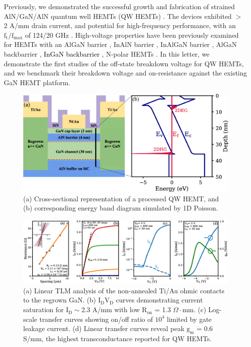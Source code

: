 \documentclass[journal]{IEEEtran}
\begin{document}
Previously, we demonstrated the successful growth and fabrication of strained AlN/GaN/AlN quantum well HEMTs (QW HEMTs) \cite{Wang2012,Islam2016,Song2017}. The devices exhibited $>$ 2 A/mm drain current, and potential for high-frequency performance, with an $\mathrm{f_t}/\mathrm{f_{max}}$ of 124/20 GHz \cite{Song2017}. High-voltage properties have been previously examined for HEMTs with an AlGaN barrier \cite{Chung2010,Palacios2006}, InAlN barrier \cite{Saunier2012,Snider2012}, InAlGaN barrier \cite{Guo2013,Lee2013}, AlGaN backbarrier \cite{Shinohara2010,Shinohara2011,Shinohara2011a,Tang2015}, \textcolor{black}{InGaN backbarrier \cite{YugangZhou2005,Palacios2006}}, N-polar HEMTs \cite{Dasgupta2009,Nidhi2012,Denninghoff2012,Denninghoff2012a,Denninghoff2013,Romanczyk2018}. In this letter, we demonstrate the first studies of the off-state breakdown voltage for QW HEMTs, and we benchmark their breakdown voltage and on-resistance against the existing GaN HEMT platform.
\begin{figure}[!b]
\centering
\includegraphics[width=\columnwidth]{Figure1.eps}
\caption{(a) Cross-sectional representation of a processed QW HEMT, and (b) corresponding energy band diagram simulated by 1D Poisson. }
\label{fig:epi}
\end{figure}

\begin{figure}[!t]
\centering
\includegraphics[width=\textwidth]{Figure2.eps}
\caption{(a) Linear TLM analysis of the non-annealed Ti/Au ohmic contacts to the regrown GaN. (b) $\mathrm{I_DV_D}$ curves demonstrating current saturation for $\mathrm{I_D}\sim$2.3 A/mm with low $\mathrm{R_{on}}$ = 1.3 $\Omega\cdot$mm. (c) Log-scale transfer curves showing on/off ratio of $\mathrm{10^4}$ limited by gate leakage current. (d) Linear transfer curves reveal peak $\mathrm{g_m}$ = 0.6 S/mm, the highest transconductance reported for QW HEMTs. }
\label{fig:IdVg}
\end{figure}
\end{document}
